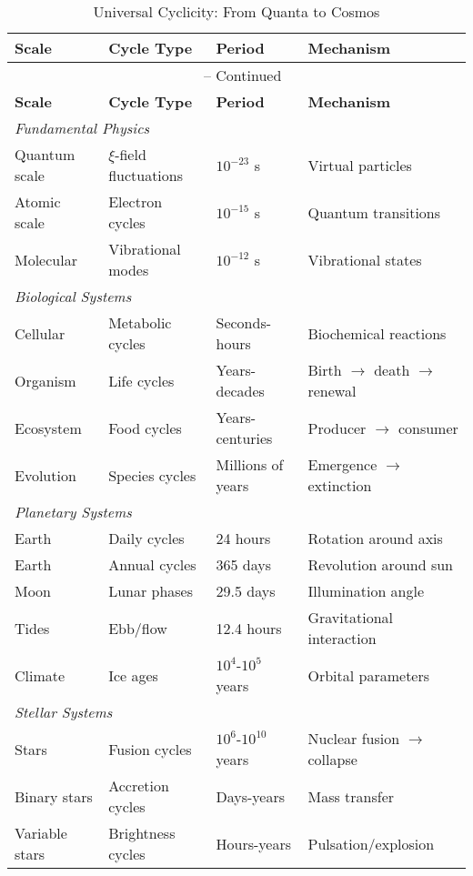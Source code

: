 \documentclass[12pt,a4paper]{article}
\theoremstyle{definition}
\begin{document}
	\begin{longtable}{llll}
		\caption{Universal Cyclicity: From Quanta to Cosmos} \\
		\toprule
		\textbf{Scale} & \textbf{Cycle Type} & \textbf{Period} & \textbf{Mechanism} \\
		\midrule
		\endfirsthead
		\multicolumn{4}{c}{\tablename\ \thetable{} -- Continued} \\
		\toprule
		\textbf{Scale} & \textbf{Cycle Type} & \textbf{Period} & \textbf{Mechanism} \\
		\midrule
		\endhead
		\multicolumn{4}{l}{\emph{Fundamental Physics}} \\
		Quantum scale & $\xi$-field fluctuations & $10^{-23}$ s & Virtual particles \\
		Atomic scale & Electron cycles & $10^{-15}$ s & Quantum transitions \\
		Molecular & Vibrational modes & $10^{-12}$ s & Vibrational states \\
		\midrule
		\multicolumn{4}{l}{\emph{Biological Systems}} \\
		Cellular & Metabolic cycles & Seconds-hours & Biochemical reactions \\
		Organism & Life cycles & Years-decades & Birth $\to$ death $\to$ renewal \\
		Ecosystem & Food cycles & Years-centuries & Producer $\to$ consumer \\
		Evolution & Species cycles & Millions of years & Emergence $\to$ extinction \\
		\midrule
		\multicolumn{4}{l}{\emph{Planetary Systems}} \\
		Earth & Daily cycles & 24 hours & Rotation around axis \\
		Earth & Annual cycles & 365 days & Revolution around sun \\
		Moon & Lunar phases & 29.5 days & Illumination angle \\
		Tides & Ebb/flow & 12.4 hours & Gravitational interaction \\
		Climate & Ice ages & $10^4$-$10^5$ years & Orbital parameters \\
		\midrule
		\multicolumn{4}{l}{\emph{Stellar Systems}} \\
		Stars & Fusion cycles & $10^6$-$10^{10}$ years & Nuclear fusion $\to$ collapse \\
		Binary stars & Accretion cycles & Days-years & Mass transfer \\
		Variable stars & Brightness cycles & Hours-years & Pulsation/explosion \\

\end{longtable}
\end{document}
